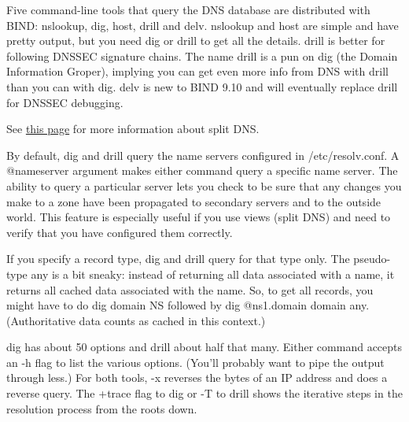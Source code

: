 \protect\hypertarget{part0024_split_018.htmlux5cux23_idIndexMarker2048}{}{}Five
command-line tools that query the DNS database are distributed with
BIND:
\protect\hypertarget{part0024_split_018.htmlux5cux23_idIndexMarker2049}{}{}{nslookup},
\protect\hypertarget{part0024_split_018.htmlux5cux23_idIndexMarker2050}{}{}{dig},
\protect\hypertarget{part0024_split_018.htmlux5cux23_idIndexMarker2051}{}{}{host},
\protect\hypertarget{part0024_split_018.htmlux5cux23_idIndexMarker2052}{}{}{drill}
and
\protect\hypertarget{part0024_split_018.htmlux5cux23_idIndexMarker2053}{}{}\protect\hypertarget{part0024_split_018.htmlux5cux23_idIndexMarker2054}{}{}{delv}.{
nslookup} and {host} are simple and have pretty output, but you need
{dig} or {drill} to get all the details. {drill} is better for following
DNSSEC signature chains. The name {drill} is a pun on {dig} (the Domain
Information Groper), implying you can get even more info from DNS with
{drill} than you can with {dig}. {delv} is new to BIND 9.10 and will
eventually replace {drill} for DNSSEC debugging.

\leavevmode\hypertarget{part0024_split_018.htmlux5cux23_idContainer921}{}%
See
\protect\hyperlink{part0024_split_046.htmlux5cux23_idTextAnchor920}{this
page} for more information about split DNS.

By default, {dig} and {drill} query the name servers configured in{
/etc/resolv.conf}. A {@}{nameserver} argument makes either command query
a specific name server. The ability to query a particular server lets
you check to be sure that any changes you make to a zone have been
propagated to secondary servers and to the outside world. This feature
is especially useful if you use views (split DNS) and need to verify
that you have configured them correctly.

If you specify a record type, {dig} and {drill} query for that type
only. The pseudo-type {any} is a bit sneaky: instead of returning all
data associated with a name, it returns all {cached} data associated
with the name. So, to get all records, you might have to do {dig}
{domain} {NS} followed by {dig @ns1.}{domain}{ }{domain}{ any}.
(Authoritative data counts as cached in this context.)

{dig} has about 50 options and {drill} about half that many. Either
command accepts an {-h} flag to list the various options. (You'll
probably want to pipe the output through {less}.) For both tools, {-x}
reverses the bytes of an IP address and does a reverse query. The
{+trace} flag to {dig} or {-T} to {drill} shows the iterative steps in
the resolution process from the roots down.

